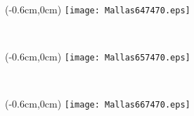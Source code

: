\documentclass[12pt,letterpaper,oneside]{report}
\begin{document}
\ \pagebreak
\begin{textblock*}{\paperwidth}(-0.6cm,0cm)
\texttt{[image: Mallas647470.eps]}
\end{textblock*}

\ \pagebreak
\begin{textblock*}{\paperwidth}(-0.6cm,0cm)
\texttt{[image: Mallas657470.eps]}
\end{textblock*}

\ \pagebreak
\begin{textblock*}{\paperwidth}(-0.6cm,0cm)
\texttt{[image: Mallas667470.eps]}
\end{textblock*}

\ \pagebreak
\end{document}
